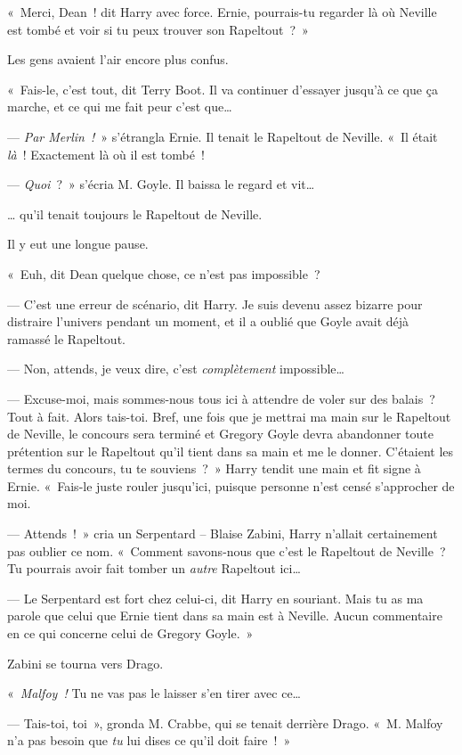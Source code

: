 «~Merci, Dean~! dit Harry avec force. Ernie, pourrais-tu regarder là où Neville est tombé et voir si tu peux trouver son Rapeltout~?~»

Les gens avaient l'air encore plus confus.

«~Fais-le, c'est tout, dit Terry Boot. Il va continuer d'essayer jusqu'à ce que ça marche, et ce qui me fait peur c'est que…

--- \emph{Par Merlin~!}~» s'étrangla Ernie. Il tenait le Rapeltout de Neville. «~Il était \emph{là}~! Exactement là où il est tombé~!

--- \emph{Quoi}~?~» s'écria M. Goyle. Il baissa le regard et vit…

… qu'il tenait toujours le Rapeltout de Neville.

Il y eut une longue pause.

«~Euh, dit Dean quelque chose, ce n'est pas impossible~?

--- C'est une erreur de scénario, dit Harry. Je suis devenu assez bizarre pour distraire l'univers pendant un moment, et il a oublié que Goyle avait déjà ramassé le Rapeltout.

--- Non, attends, je veux dire, c'est \emph{complètement} impossible…

--- Excuse-moi, mais sommes-nous tous ici à attendre de voler sur des balais~? Tout à fait. Alors tais-toi. Bref, une fois que je mettrai ma main sur le Rapeltout de Neville, le concours sera terminé et Gregory Goyle devra abandonner toute prétention sur le Rapeltout qu'il tient dans sa main et me le donner. C'étaient les termes du concours, tu te souviens~?~» Harry tendit une main et fit signe à Ernie. «~Fais-le juste rouler jusqu'ici, puisque personne n'est censé s'approcher de moi.

--- Attends~!~» cria un Serpentard -- Blaise Zabini, Harry n'allait certainement pas oublier ce nom. «~Comment savons-nous que c'est le Rapeltout de Neville~? Tu pourrais avoir fait tomber un \emph{autre} Rapeltout ici…

--- Le Serpentard est fort chez celui-ci, dit Harry en souriant. Mais tu as ma parole que celui que Ernie tient dans sa main est à Neville. Aucun commentaire en ce qui concerne celui de Gregory Goyle.~»

Zabini se tourna vers Drago.

«~\emph{Malfoy~!} Tu ne vas pas le laisser s'en tirer avec ce…

--- Tais-toi, toi~», gronda M. Crabbe, qui se tenait derrière Drago. «~M. Malfoy n'a pas besoin que \emph{tu} lui dises ce qu'il doit faire~!~»

